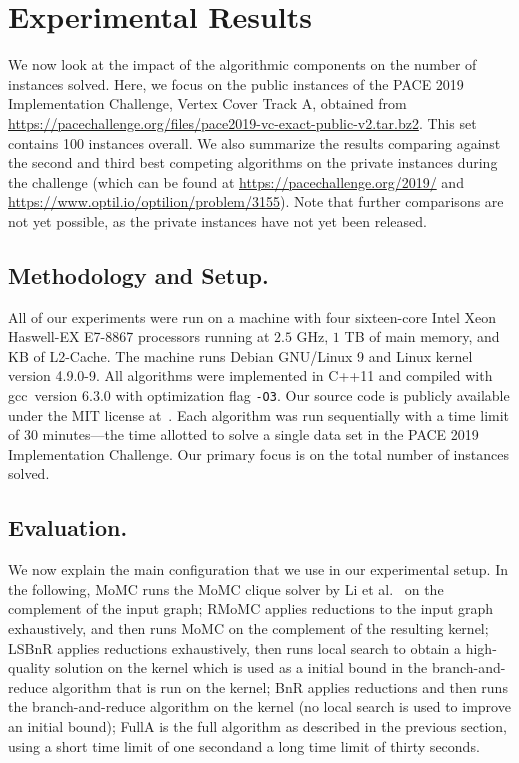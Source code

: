 \documentclass[twoside,leqno,twocolumn]{article}
\newcommand{\AlgName}[1]{\textsf{#1}}
\begin{document}
\section{Experimental Results}
\label{sec:experiments}
We now look at the impact of the algorithmic components on the number of instances solved.
Here, we focus on the public instances  of the PACE 2019 Implementation Challenge, Vertex Cover Track A, obtained from \url{https://pacechallenge.org/files/pace2019-vc-exact-public-v2.tar.bz2}. This set contains 100 instances overall. We also summarize the results comparing against the second and third best competing algorithms on the private instances during the challenge (which can be found at \url{https://pacechallenge.org/2019/} and \url{https://www.optil.io/optilion/problem/3155}). Note that further comparisons are not yet possible, as the private instances have not yet been released. 

\subsection{Methodology and Setup.}
All of our experiments were run on a machine with  four sixteen-core Intel Xeon Haswell-EX E7-8867 processors running at $2.5$ GHz, $1$ TB of main memory, and  KB of L2-Cache.
The machine runs Debian GNU/Linux 9 and Linux kernel version 4.9.0-9.
All algorithms were implemented in C++11 and compiled with gcc~version 6.3.0 with optimization flag \texttt{-O3}. Our source code is publicly available under the MIT license at~\cite{wegotyoucovered2019}.
Each algorithm was run sequentially with a time limit of 30 minutes---the time allotted to solve a single data set in the PACE 2019 Implementation Challenge. Our primary focus is on the total number of instances solved.
\subsection{Evaluation.}
We now explain the main configuration that we use in our experimental setup.
In the following, \AlgName{MoMC} runs the MoMC clique solver by Li et al.~\cite{DBLP:journals/cor/LiJM17} on the complement of the input graph; \AlgName{RMoMC} applies reductions to the input graph exhaustively, and then runs MoMC on the complement of the resulting kernel; \AlgName{LSBnR} applies reductions exhaustively, then runs local search to obtain a high-quality solution on the kernel which is used as a initial bound in the branch-and-reduce algorithm that is run on the kernel; \AlgName{BnR} applies reductions and then runs the branch-and-reduce algorithm on the kernel (no local search is used to improve an initial bound); \AlgName{FullA} is the full algorithm as described in the previous section, using a short time limit of one second\iffalse (and a budget of \numprint{50000} branches for MoMC)\comment[id=DS]{we use 100,000 for the run on the original graph. D'oh.}\fi and a long time limit of thirty seconds.
\end{document}
